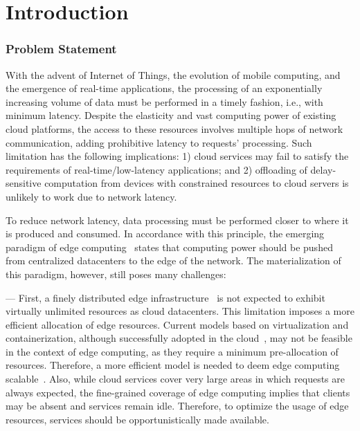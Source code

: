 \section{Introduction}


\subsubsection*{Problem Statement}


With the advent of Internet of Things, the evolution of mobile computing, and the emergence of real-time applications, the processing of an exponentially increasing volume of data must be performed in a timely fashion, i.e., with minimum latency. Despite the elasticity and vast computing power of existing cloud platforms, the access to these resources involves multiple hops of network communication, adding prohibitive latency to requests' processing. Such limitation has the following implications: 1) cloud services may fail to satisfy the requirements of real-time/low-latency applications; and 2) offloading of delay-sensitive computation from devices with constrained resources to cloud servers is unlikely to work due to network latency.

To reduce network latency, data processing must be performed closer to where it is produced and consumed. In accordance with this principle, the emerging paradigm of edge computing~\cite{Shi:2016} states that computing power should be pushed from centralized datacenters to the edge of the network. 
The materialization of this paradigm, however, still poses many challenges:

--- First, a finely distributed edge infrastructure~\cite{Dehos14millimeter5g} is not expected to exhibit virtually unlimited resources as cloud datacenters. This limitation imposes a more efficient allocation of edge resources. Current models based on virtualization and containerization, although successfully adopted in the cloud~\cite{zabolotnyi2015jcloudscale}, may not be feasible in the context of edge computing, as they require a minimum pre-allocation of resources. Therefore, a more efficient model is needed to deem edge computing scalable~\cite{GarrigaMendonca2017}. Also, while cloud services cover very large areas in which requests are always expected, the fine-grained coverage of edge computing implies that clients may be absent and services remain idle. Therefore, to optimize the usage of edge resources, services should be opportunistically made available.

